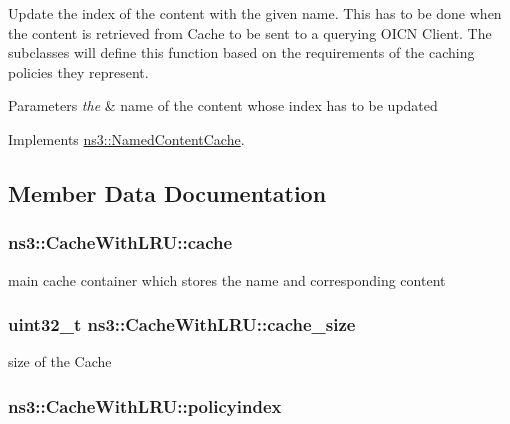 Update the index of the content with the given name. This has to be done when the content is retrieved from Cache to be sent to a querying O\-I\-C\-N Client. The subclasses will define this function based on the requirements of the caching policies they represent. 


\begin{DoxyParams}{Parameters}
{\em the} & name of the content whose index has to be updated \\
\hline
\end{DoxyParams}


Implements \hyperlink{classns3_1_1NamedContentCache_aeabf8afacd89cbc46b78b382c8a487e8}{ns3\-::\-Named\-Content\-Cache}.



\subsection{Member Data Documentation}
\hypertarget{classns3_1_1CacheWithLRU_ae7ffb4f0cbe5e8e6d769b71dc26d61d4}{
\subsubsection[{cache}]{ ns3\-::\-Cache\-With\-L\-R\-U\-::cache\hspace{0.3cm}{\ttfamily [private]}}}\label{classns3_1_1CacheWithLRU_ae7ffb4f0cbe5e8e6d769b71dc26d61d4}


main cache container which stores the name and corresponding content 

\hypertarget{classns3_1_1CacheWithLRU_a9bd4ccdfb85587489ed2832695e0da62}{
\subsubsection[{cache\-\_\-size}]{\setlength{\rightskip}{0pt plus 5cm}uint32\-\_\-t ns3\-::\-Cache\-With\-L\-R\-U\-::cache\-\_\-size\hspace{0.3cm}{\ttfamily [private]}}}\label{classns3_1_1CacheWithLRU_a9bd4ccdfb85587489ed2832695e0da62}


size of the Cache 

\hypertarget{classns3_1_1CacheWithLRU_ada6a1db505251a0b7d96a18cf5cf0f1b}{
\subsubsection[{policyindex}]{ ns3\-::\-Cache\-With\-L\-R\-U\-::policyindex\hspace{0.3cm}{\ttfamily [private]}}}\label{classns3_1_1CacheWithLRU_ada6a1db505251a0b7d96a18cf5cf0f1b}


